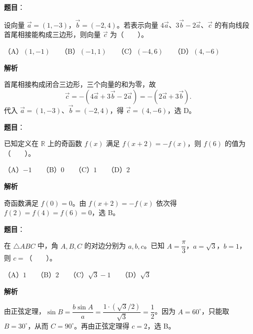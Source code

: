 \begin{answer}

\textbf{题目}：

设向量 $\vec a=(1,-3)$，$\vec b=(-2,4)$。若表示向量 $4\vec a$、$3\vec b-2\vec a$、$\vec c$ 的有向线段首尾相接能构成三边形，则向量 $\vec c$ 为\mbox{（　　）}。

（A）$(1,-1)$　　（B）$(-1,1)$　　（C）$(-4,6)$　　（D）$(4,-6)$

\textbf{解析}

首尾相接构成闭合三边形，三个向量的和为零，故
\nopagebreak[4]
\[
\vec c=-\left(4\vec a+3\vec b-2\vec a\right)=-\left(2\vec a+3\vec b\right).
\]
代入 $\vec a=(1,-3)$、$\vec b=(-2,4)$，得 $\vec c=(4,-6)$，选 D。


\end{answer}
\begin{answer}

\textbf{题目}：

已知定义在 $\mathbb R$ 上的奇函数 $f(x)$ 满足 $f(x+2)=-f(x)$，则 $f(6)$ 的值为\mbox{（　　）}。

（A）$-1$　　（B）$0$　　（C）$1$　　（D）$2$

\textbf{解析}

奇函数满足 $f(0)=0$。由 $f(x+2)=-f(x)$ 依次得 $f(2)=f(4)=f(6)=0$，选 B。


\end{answer}
\begin{answer}

\textbf{题目}：

在 $\triangle ABC$ 中，角 $A,B,C$ 的对边分别为 $a,b,c$。已知 $A=\dfrac{\pi}{3}$，$a=\sqrt3$，$b=1$，则 $c=$\mbox{（　　）}。

（A）$1$　　（B）$2$　　（C）$\sqrt3-1$　　（D）$\sqrt3$

\textbf{解析}

由正弦定理，$\sin B=\dfrac{b\sin A}{a}=\dfrac{1\cdot(\sqrt3/2)}{\sqrt3}=\dfrac12$。因为 $A=60^\circ$，只能取 $B=30^\circ$，从而 $C=90^\circ$。再由正弦定理得 $c=2$，选 B。


\end{answer}
